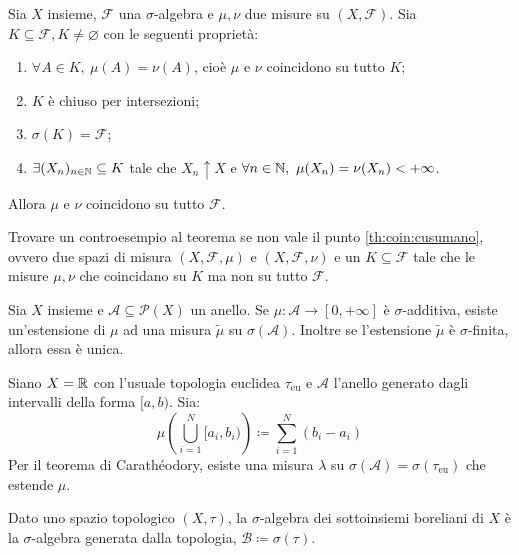 \begin{thm} \label{thm:coincidenza}
	Sia $X$ insieme, $\mathcal{F}$ una $\sigma$-algebra e $\mu, \nu$ due misure su $(X,\mathcal{F})$. Sia $K\subseteq \mathcal{F}, K\neq \varnothing$ con le seguenti proprietà:
	\begin{enumerate}[label=(\roman*)]
	\item $\forall A \in K, \ \mu(A)=\nu(A)$, cioè $\mu$ e $\nu$ coincidono su tutto $K$;
	\item $K$ è chiuso per intersezioni;
	\item $\sigma(K)=\mathcal{F}$;
	\item\label{th:coin:cusumano} $\exists (X_n)_{n\in \mathbb{N}}\subseteq K $ tale che $ X_n \uparrow X$ e $\forall n \in \N, \ \mu(X_n)=\nu(X_n)<+\infty$.
	\end{enumerate}
Allora $\mu$ e $\nu$ coincidono su tutto $\mathcal{F}$.
\end{thm}

\begin{exercise}
	Trovare un controesempio al teorema se non vale il punto \ref{th:coin:cusumano}, ovvero due spazi di misura $(X, \mathcal{F}, \mu)$ e $ (X, \mathcal{F}, \nu) $ e un $ K \subseteq \mathcal{F} $ tale che le misure $\mu,\nu$ che coincidano su $K$ ma non su tutto $\mathcal{F}$.
\end{exercise}

\begin{thm}
	Sia $X$ insieme e $\mathcal{A}\subseteq \mathscr{P}(X)$ un anello. Se ${\mu\colon\mathcal{A}\to[0,+\infty]}$ è $\sigma$-additiva, esiste un'estensione di $\mu$ ad una misura $\tilde\mu$ su $\sigma(\mathcal{A})$. Inoltre se l'estensione $\tilde\mu$ è $\sigma$-finita, allora essa è unica.
\end{thm}

\begin{example}
	Siano $ X = \mathbb{R} $ con l'usuale topologia euclidea $ \tau_{\mathrm{eu}} $ e $ \mathcal{A} $ l'anello generato dagli intervalli della forma $[a,b)$. Sia:
	\[ \mu\left( \bigcup_{i=1}^N [a_i,b_i) \right) \coloneqq \sum_{i=1}^N (b_i-a_i) \]
	Per il teorema di Carathéodory, esiste una misura $\lambda$ su $\sigma(\mathcal{A})=\sigma(\tau_{\mathrm{eu}})$ che estende $\mu$.
\end{example}

\begin{definition}[boreliani]
    Dato uno spazio topologico $ (X, \tau) $, la $ \sigma $-algebra dei sottoinsiemi boreliani di $ X $ è la $ \sigma $-algebra generata dalla topologia, $ \mathcal{B} \coloneqq \sigma(\tau) $.
\end{definition}

